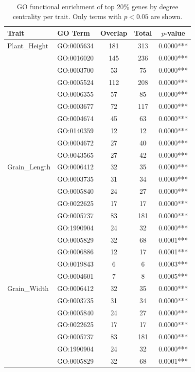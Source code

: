\begin{table}[htbp]
\centering
\caption{GO functional enrichment of top 20\% genes by degree centrality per trait. Only terms with $p<0.05$ are shown.}
\label{tab:go_enrichment}
\begin{tabular}{llccc}
\toprule
\textbf{Trait} & \textbf{GO Term} & \textbf{Overlap} & \textbf{Total} & \textbf{$p$-value} \\
\midrule
Plant_Height & GO:0005634 & 181 & 313 & 0.0000*** \\
 & GO:0016020 & 145 & 236 & 0.0000*** \\
 & GO:0003700 & 53 & 75 & 0.0000*** \\
 & GO:0005524 & 112 & 208 & 0.0000*** \\
 & GO:0006355 & 57 & 85 & 0.0000*** \\
 & GO:0003677 & 72 & 117 & 0.0000*** \\
 & GO:0004674 & 45 & 63 & 0.0000*** \\
 & GO:0140359 & 12 & 12 & 0.0000*** \\
 & GO:0004672 & 27 & 40 & 0.0000*** \\
 & GO:0043565 & 27 & 42 & 0.0000*** \\
Grain_Length & GO:0006412 & 32 & 35 & 0.0000*** \\
 & GO:0003735 & 31 & 34 & 0.0000*** \\
 & GO:0005840 & 24 & 27 & 0.0000*** \\
 & GO:0022625 & 17 & 17 & 0.0000*** \\
 & GO:0005737 & 83 & 181 & 0.0000*** \\
 & GO:1990904 & 24 & 32 & 0.0000*** \\
 & GO:0005829 & 32 & 68 & 0.0001*** \\
 & GO:0006886 & 12 & 17 & 0.0001*** \\
 & GO:0019843 & 6 & 6 & 0.0003*** \\
 & GO:0004601 & 7 & 8 & 0.0005*** \\
Grain_Width & GO:0006412 & 32 & 35 & 0.0000*** \\
 & GO:0003735 & 31 & 34 & 0.0000*** \\
 & GO:0005840 & 24 & 27 & 0.0000*** \\
 & GO:0022625 & 17 & 17 & 0.0000*** \\
 & GO:0005737 & 83 & 181 & 0.0000*** \\
 & GO:1990904 & 24 & 32 & 0.0000*** \\
 & GO:0005829 & 32 & 68 & 0.0001*** \\

\end{tabular}
\end{table}
